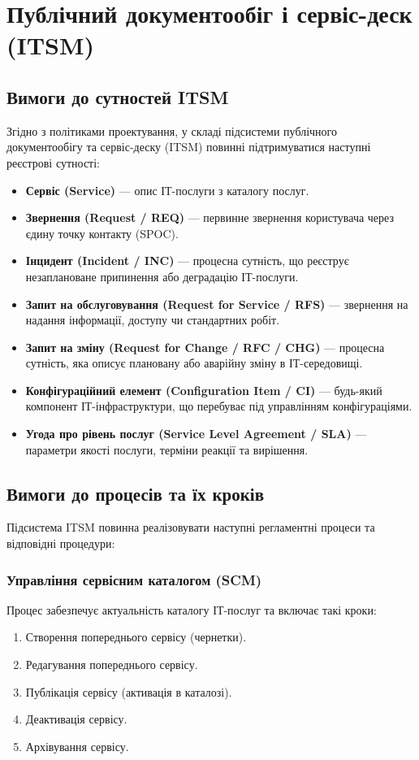\documentclass{article}
\begin{document}
\newpage
\section{Публічний документообіг і сервіс-деск (ITSM)}

\subsection{Вимоги до сутностей ITSM}
Згідно з політиками проектування, у складі підсистеми публічного документообігу та сервіс-деску (ITSM) повинні підтримуватися наступні реєстрові сутності:
\begin{itemize}
    \item \textbf{Сервіс (Service)} — опис ІТ-послуги з каталогу послуг.
    \item \textbf{Звернення (Request / REQ)} — первинне звернення користувача через єдину точку контакту (SPOC).
    \item \textbf{Інцидент (Incident / INC)} — процесна сутність, що реєструє незаплановане припинення або деградацію ІТ-послуги.
    \item \textbf{Запит на обслуговування (Request for Service / RFS)} — звернення на надання інформації, доступу чи стандартних робіт.
    \item \textbf{Запит на зміну (Request for Change / RFC / CHG)} — процесна сутність, яка описує плановану або аварійну зміну в ІТ-середовищі.
    \item \textbf{Конфігураційний елемент (Configuration Item / CI)} — будь-який компонент ІТ-інфраструктури, що перебуває під управлінням конфігураціями.
    \item \textbf{Угода про рівень послуг (Service Level Agreement / SLA)} — параметри якості послуги, терміни реакції та вирішення.
\end{itemize}

\subsection{Вимоги до процесів та їх кроків}
Підсистема ITSM повинна реалізовувати наступні регламентні процеси та відповідні процедури:

\subsubsection{Управління сервісним каталогом (SCM)}
Процес забезпечує актуальність каталогу ІТ-послуг та включає такі кроки:
\begin{enumerate}
    \item Створення попереднього сервісу (чернетки).
    \item Редагування попереднього сервісу.
    \item Публікація сервісу (активація в каталозі).
    \item Деактивація сервісу.
    \item Архівування сервісу.
\end{enumerate}
\end{document}

